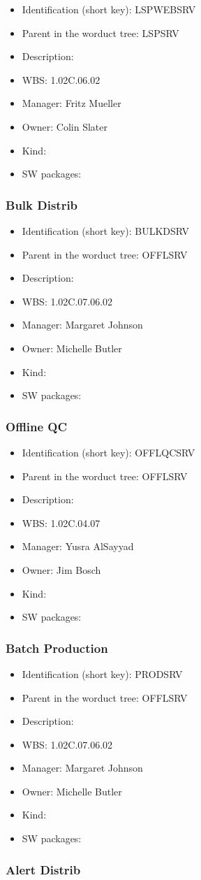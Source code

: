 \begin{itemize}\item Identification (short key): LSPWEBSRV
\item Parent in the worduct tree: LSPSRV
\item Description: 
\item WBS: 1.02C.06.02
\item Manager: Fritz Mueller
\item Owner: Colin Slater
\item Kind:
\item SW packages: 
\end{itemize}\subsubsection{Bulk Distrib}
\begin{itemize}\item Identification (short key): BULKDSRV
\item Parent in the worduct tree: OFFLSRV
\item Description: 
\item WBS: 1.02C.07.06.02
\item Manager: Margaret Johnson
\item Owner: Michelle Butler
\item Kind:
\item SW packages: 
\end{itemize}\subsubsection{Offline QC}
\begin{itemize}\item Identification (short key): OFFLQCSRV
\item Parent in the worduct tree: OFFLSRV
\item Description: 
\item WBS: 1.02C.04.07
\item Manager: Yusra AlSayyad
\item Owner: Jim Bosch
\item Kind:
\item SW packages: 
\end{itemize}\subsubsection{Batch Production}
\begin{itemize}\item Identification (short key): PRODSRV
\item Parent in the worduct tree: OFFLSRV
\item Description: 
\item WBS: 1.02C.07.06.02
\item Manager: Margaret Johnson
\item Owner: Michelle Butler
\item Kind:
\item SW packages: 
\end{itemize}\subsubsection{Alert Distrib}
